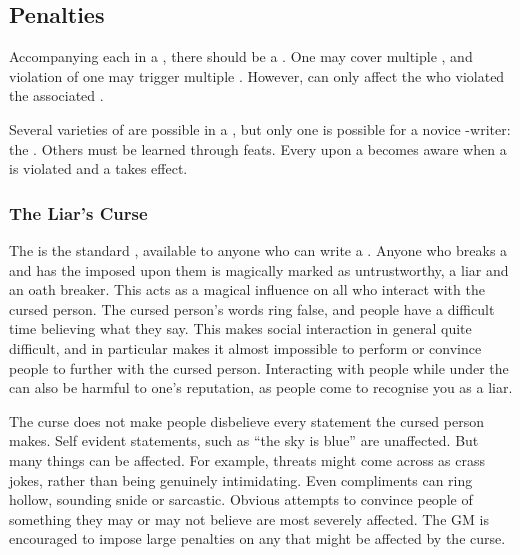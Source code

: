 \subsection{Penalties}

Accompanying each {\stipulation} in a {\contract}, there should be a {\contractpenalty}.
One {\contractpenalty} may cover multiple {\stipulations}, and violation of one {\stipulation} may trigger multiple {\penalties}.
However, {\penalties} can only affect the {\signatories} who violated the associated {\stipulations}.

Several varieties of {\contractpenalty} are possible in a {\contract}, but only one is possible for a novice {\contract}-writer: the {\liarscurse}.
Others must be learned through feats.
Every {\signatory} upon a {\contract} becomes aware when a {\stipulation} is violated and a {\contractpenalty} takes effect.

\subsubsection{The Liar's Curse}

The {\liarscurse} is the standard {\contractpenalty}, available to anyone who can write a {\contract}.
Anyone who breaks a {\contract} and has the {\liarscurse} imposed upon them is magically marked as untrustworthy, a liar and an oath breaker.
This acts as a magical influence on all who interact with the cursed person.
The cursed person's words ring false, and people have a difficult time believing what they say.
This makes social interaction in general quite difficult, and in particular makes it almost impossible to perform  or convince people to {\sign} further {\contracts} with the cursed person.
Interacting with people while under the {\liarscurse} can also be harmful to one's reputation, as people come to recognise you as a liar.

The curse does not make people disbelieve every statement the cursed person makes.
Self evident statements, such as ``the sky is blue'' are unaffected.
But many things can be affected.
For example, threats might come across as crass jokes, rather than being genuinely intimidating.
Even compliments can ring hollow, sounding snide or sarcastic.
Obvious attempts to convince people of something they may or may not believe are most severely affected.
The GM is encouraged to impose large penalties on any {\tests} that might be affected by the curse.

